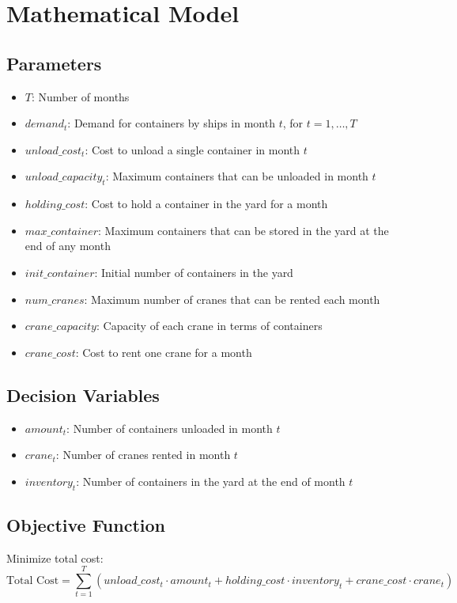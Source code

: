 \documentclass{article}
\begin{document}
\section*{Mathematical Model}

\subsection*{Parameters}
\begin{itemize}
    \item $T$: Number of months
    \item $demand_{t}$: Demand for containers by ships in month $t$, for $t = 1, \ldots, T$
    \item $unload\_cost_{t}$: Cost to unload a single container in month $t$
    \item $unload\_capacity_{t}$: Maximum containers that can be unloaded in month $t$
    \item $holding\_cost$: Cost to hold a container in the yard for a month
    \item $max\_container$: Maximum containers that can be stored in the yard at the end of any month
    \item $init\_container$: Initial number of containers in the yard
    \item $num\_cranes$: Maximum number of cranes that can be rented each month
    \item $crane\_capacity$: Capacity of each crane in terms of containers
    \item $crane\_cost$: Cost to rent one crane for a month
\end{itemize}

\subsection*{Decision Variables}
\begin{itemize}
    \item $amount_{t}$: Number of containers unloaded in month $t$
    \item $crane_{t}$: Number of cranes rented in month $t$
    \item $inventory_{t}$: Number of containers in the yard at the end of month $t$
\end{itemize}

\subsection*{Objective Function}
Minimize total cost:
\[
\text{Total Cost} = \sum_{t=1}^{T} \left( unload\_cost_{t} \cdot amount_{t} + holding\_cost \cdot inventory_{t} + crane\_cost \cdot crane_{t} \right)
\]
\end{document}
